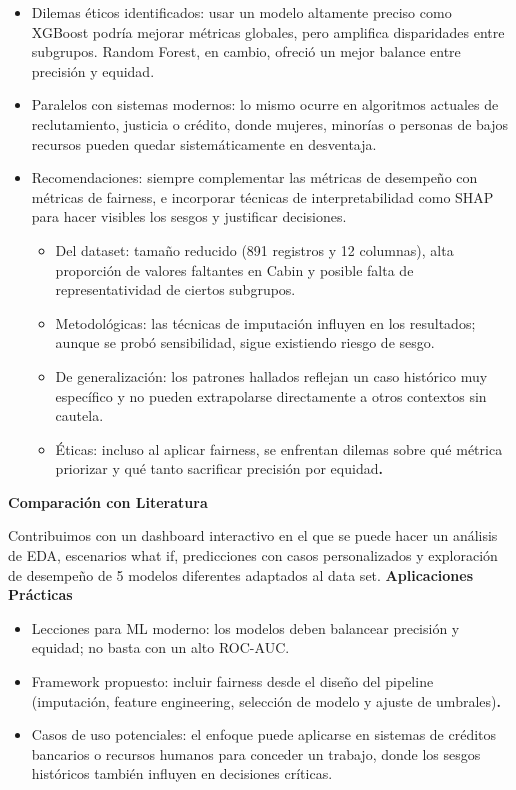 \documentclass[sjournal]{IEEEtran}
\begin{document}
\begin{itemize}
    \item Dilemas éticos identificados: usar un modelo altamente preciso como XGBoost podría mejorar métricas globales, pero amplifica disparidades entre subgrupos. Random Forest, en cambio, ofreció un mejor balance entre precisión y equidad.
    \item Paralelos con sistemas modernos: lo mismo ocurre en algoritmos actuales de reclutamiento, justicia o crédito, donde mujeres, minorías o personas de bajos recursos pueden quedar sistemáticamente en desventaja.
    \item Recomendaciones: siempre complementar las métricas de desempeño con métricas de fairness, e incorporar técnicas de interpretabilidad como SHAP para hacer visibles los sesgos y justificar decisiones.
\begin{itemize}
    \item Del dataset: tamaño reducido (891 registros y 12 columnas), alta proporción de valores faltantes en Cabin y posible falta de representatividad de ciertos subgrupos.
    \item Metodológicas: las técnicas de imputación influyen en los resultados; aunque se probó sensibilidad, sigue existiendo riesgo de sesgo.
    \item De generalización: los patrones hallados reflejan un caso histórico muy específico y no pueden extrapolarse directamente a otros contextos sin cautela.
    \item Éticas: incluso al aplicar fairness, se enfrentan dilemas sobre qué métrica priorizar y qué tanto sacrificar precisión por equidad\textbf{.}
\end{itemize}

\end{itemize}


\textbf{Comparación con Literatura}

\vspace{0.2cm}
Contribuimos con un dashboard interactivo en el que se puede hacer un análisis de EDA, escenarios what if, predicciones con casos personalizados y exploración de desempeño de 5 modelos diferentes adaptados al data set.
\textbf{Aplicaciones Prácticas}
  
\begin{itemize}
    \item Lecciones para ML moderno: los modelos deben balancear precisión y equidad; no basta con un alto ROC-AUC.
    \item Framework propuesto: incluir fairness desde el diseño del pipeline (imputación, feature engineering, selección de modelo y ajuste de umbrales)\textbf{.}
    \item Casos de uso potenciales: el enfoque puede aplicarse en sistemas de créditos bancarios o recursos humanos para conceder un trabajo, donde los sesgos históricos también influyen en decisiones críticas.
\end{itemize}
\end{document}

